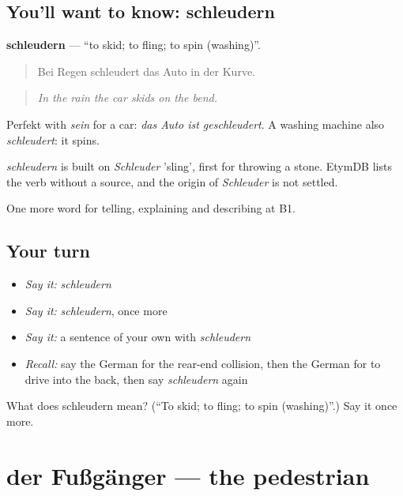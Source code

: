 \subsection*{You'll want to know: schleudern}
\textbf{schleudern} — \textquotedblleft{}to skid; to fling; to spin (washing)\textquotedblright{}.

\begin{quote}
Bei Regen schleudert das Auto in der Kurve.
\end{quote}

\begin{quote}
\emph{In the rain the car skids on the bend.}
\end{quote}

Perfekt with \emph{sein} for a car: \emph{das Auto ist geschleudert}. A washing machine also \emph{schleudert}: it spins.

\begin{cousinweb}
\emph{schleudern} is built on \emph{Schleuder} 'sling', first for throwing a stone. EtymDB lists the verb without a source, and the origin of \emph{Schleuder} is not settled.
\end{cousinweb}

\begin{grammarlens}[title={What you've built}]
One more word for telling, explaining and describing at B1.
\end{grammarlens}

\subsection*{Your turn}
\begin{itemize}
\raggedright
  \item \emph{Say it:} \emph{schleudern}
  \item \emph{Say it:} \emph{schleudern}, once more
  \item \emph{Say it:} a sentence of your own with \emph{schleudern}
  \item \emph{Recall:} say the German for the rear-end collision, then the German for to drive into the back, then say \emph{schleudern} again
\end{itemize}

\begin{tcolorbox}[breakable,colback=teal!4,colframe=teal!35!black,title={Before you move on}]
What does schleudern mean? (\textquotedblleft{}To skid; to fling; to spin (washing)\textquotedblright{}.) Say it once more.
\end{tcolorbox}
\section[der Fußgänger]{der Fußgänger — the pedestrian}

